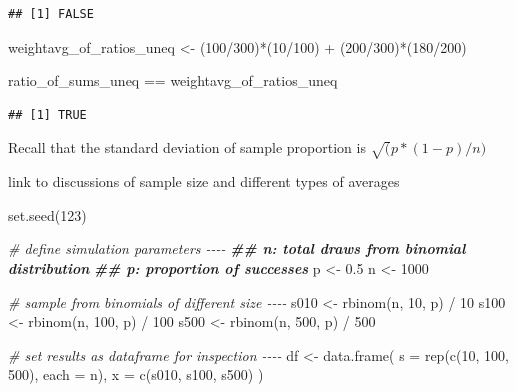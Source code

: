 \documentclass[
]{krantz}
\makeatletter
\newenvironment{Shaded}{\begin{snugshade}}{\end{snugshade}}
\newcommand{\AttributeTok}[1]{\textcolor[rgb]{0.61,0.61,0.61}{#1}}
\newcommand{\CommentTok}[1]{\textcolor[rgb]{0.37,0.37,0.37}{\textit{#1}}}
\newcommand{\DecValTok}[1]{\textcolor[rgb]{0.06,0.06,0.06}{#1}}
\newcommand{\DocumentationTok}[1]{\textcolor[rgb]{0.37,0.37,0.37}{\textbf{\textit{#1}}}}
\newcommand{\FloatTok}[1]{\textcolor[rgb]{0.06,0.06,0.06}{#1}}
\newcommand{\FunctionTok}[1]{\textcolor[rgb]{0,0,0}{#1}}
\newcommand{\NormalTok}[1]{#1}
\newcommand{\OtherTok}[1]{\textcolor[rgb]{0.37,0.37,0.37}{#1}}
\newcommand{\SpecialCharTok}[1]{\textcolor[rgb]{0,0,0}{#1}}
\newenvironment{kframe}{%
\medskip{}
\setlength{\fboxsep}{.8em}
 \def\at@end@of@kframe{}%
 \ifinner\ifhmode%
  \def\at@end@of@kframe{\end{minipage}}%
  \begin{minipage}{\columnwidth}%
 \fi\fi%
 \def\FrameCommand##1{\hskip\@totalleftmargin \hskip-\fboxsep
 \colorbox{shadecolor}{##1}\hskip-\fboxsep
     \hskip-\linewidth \hskip-\@totalleftmargin \hskip\columnwidth}%
 \MakeFramed {\advance\hsize-\width
   \@totalleftmargin\z@ \linewidth\hsize
   \@setminipage}}%
 {\par\unskip\endMakeFramed%
 \at@end@of@kframe}
\renewenvironment{Shaded}{\begin{kframe}}{\end{kframe}}
\makeatother
\begin{document}
\begin{verbatim}
## [1] FALSE
\end{verbatim}

\begin{Shaded}
\begin{Highlighting}[]
\NormalTok{weightavg\_of\_ratios\_uneq }\OtherTok{\textless{}{-}}\NormalTok{ (}\DecValTok{100}\SpecialCharTok{/}\DecValTok{300}\NormalTok{)}\SpecialCharTok{*}\NormalTok{(}\DecValTok{10}\SpecialCharTok{/}\DecValTok{100}\NormalTok{) }\SpecialCharTok{+}\NormalTok{ (}\DecValTok{200}\SpecialCharTok{/}\DecValTok{300}\NormalTok{)}\SpecialCharTok{*}\NormalTok{(}\DecValTok{180}\SpecialCharTok{/}\DecValTok{200}\NormalTok{)}

\NormalTok{ratio\_of\_sums\_uneq }\SpecialCharTok{==}\NormalTok{ weightavg\_of\_ratios\_uneq}
\end{Highlighting}
\end{Shaded}

\begin{verbatim}
## [1] TRUE
\end{verbatim}

Recall that the standard deviation of sample proportion is \(\sqrt(p*(1-p)/n)\)

link to discussions of sample size and different types of averages

\begin{Shaded}
\begin{Highlighting}[]
\FunctionTok{set.seed}\NormalTok{(}\DecValTok{123}\NormalTok{)}

\CommentTok{\# define simulation parameters {-}{-}{-}{-}}
\DocumentationTok{\#\# n: total draws from binomial distribution}
\DocumentationTok{\#\# p: proportion of successes}
\NormalTok{p }\OtherTok{\textless{}{-}} \FloatTok{0.5}
\NormalTok{n }\OtherTok{\textless{}{-}} \DecValTok{1000}

\CommentTok{\# sample from binomials of different size {-}{-}{-}{-}}
\NormalTok{s010 }\OtherTok{\textless{}{-}} \FunctionTok{rbinom}\NormalTok{(n,  }\DecValTok{10}\NormalTok{, p) }\SpecialCharTok{/}  \DecValTok{10}
\NormalTok{s100 }\OtherTok{\textless{}{-}} \FunctionTok{rbinom}\NormalTok{(n, }\DecValTok{100}\NormalTok{, p) }\SpecialCharTok{/} \DecValTok{100}
\NormalTok{s500 }\OtherTok{\textless{}{-}} \FunctionTok{rbinom}\NormalTok{(n, }\DecValTok{500}\NormalTok{, p) }\SpecialCharTok{/} \DecValTok{500}

\CommentTok{\# set results as dataframe for inspection {-}{-}{-}{-}}
\NormalTok{df }\OtherTok{\textless{}{-}} \FunctionTok{data.frame}\NormalTok{(}
  \AttributeTok{s =} \FunctionTok{rep}\NormalTok{(}\FunctionTok{c}\NormalTok{(}\DecValTok{10}\NormalTok{, }\DecValTok{100}\NormalTok{, }\DecValTok{500}\NormalTok{), }\AttributeTok{each =}\NormalTok{ n),}
  \AttributeTok{x =} \FunctionTok{c}\NormalTok{(s010, s100, s500)}
\NormalTok{)}
\end{Highlighting}
\end{Shaded}
\end{document}
